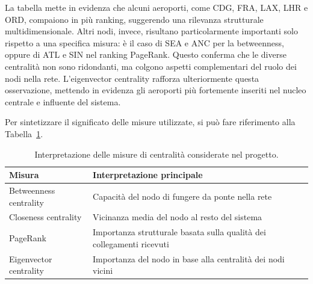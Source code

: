 La tabella mette in evidenza che alcuni aeroporti, come CDG, FRA, LAX, LHR e ORD, compaiono in più ranking, suggerendo una rilevanza strutturale multidimensionale. Altri nodi, invece, risultano particolarmente importanti solo rispetto a una specifica misura: è il caso di SEA e ANC per la betweenness, oppure di ATL e SIN nel ranking PageRank. Questo conferma che le diverse centralità non sono ridondanti, ma colgono aspetti complementari del ruolo dei nodi nella rete. L’eigenvector centrality rafforza ulteriormente questa osservazione, mettendo in evidenza gli aeroporti più fortemente inseriti nel nucleo centrale e influente del sistema.

Per sintetizzare il significato delle misure utilizzate, si può fare riferimento alla Tabella~\ref{tab:centrality_meaning}.

\begin{table}[H]
\centering
\caption{Interpretazione delle misure di centralità considerate nel progetto.}
\label{tab:centrality_meaning}
\begin{tabular}{ll}
\toprule
\textbf{Misura} & \textbf{Interpretazione principale} \\
\midrule
Betweenness centrality & Capacità del nodo di fungere da ponte nella rete \\
Closeness centrality & Vicinanza media del nodo al resto del sistema \\
PageRank & Importanza strutturale basata sulla qualità dei collegamenti ricevuti \\
Eigenvector centrality & Importanza del nodo in base alla centralità dei nodi vicini \\
\bottomrule
\end{tabular}
\end{table}